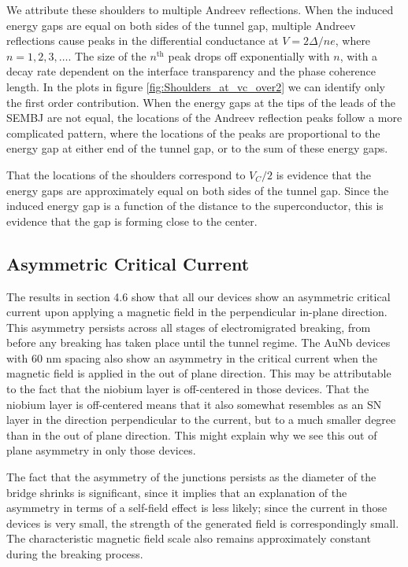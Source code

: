 We attribute these shoulders to multiple Andreev reflections. When the induced energy gaps are equal on both sides of the tunnel gap, multiple Andreev reflections cause peaks in the differential conductance at $V = 2\Delta / ne$, where $n = 1,2,3,\ldots$. The size of the $n^\mathrm{th}$ peak drops off exponentially with $n$, with a decay rate dependent on the interface transparency and the phase coherence length. In the plots in figure \ref{fig:Shoulders_at_vc_over2} we can identify only the first order contribution. When the energy gaps at the tips of the leads of the SEMBJ are not equal, the locations of the Andreev reflection peaks follow a more complicated pattern, where the locations of the peaks are proportional to the energy gap at either end of the tunnel gap, or to the sum of these energy gaps. 

That the locations of the shoulders correspond to $V_C/2$ is evidence that the energy gaps are approximately equal on both sides of the tunnel gap. Since the induced energy gap is a function of the distance to the superconductor, this is evidence that the gap is forming close to the center.  

\subsection{Asymmetric Critical Current}

The results in section 4.6 show that all our devices show an asymmetric critical current upon applying a magnetic field in the perpendicular in-plane direction. This asymmetry persists across all stages of electromigrated breaking, from before any breaking has taken place until the tunnel regime. The AuNb devices with 60 nm spacing also show an asymmetry in the critical current when the magnetic field is applied in the out of plane direction. This may be attributable to the fact that the niobium layer is off-centered in those devices. That the niobium layer is off-centered means that it also somewhat resembles as an SN layer in the direction perpendicular to the current, but to a much smaller degree than in the out of plane direction. This might explain why we see this out of plane asymmetry in only those devices. 

The fact that the asymmetry of the junctions persists as the diameter of the bridge shrinks is significant, since it implies that an explanation of the asymmetry in terms of a self-field effect is less likely; since the current in those devices is very small, the strength of the generated field is correspondingly small. The characteristic magnetic field scale also remains approximately constant during the breaking process.

